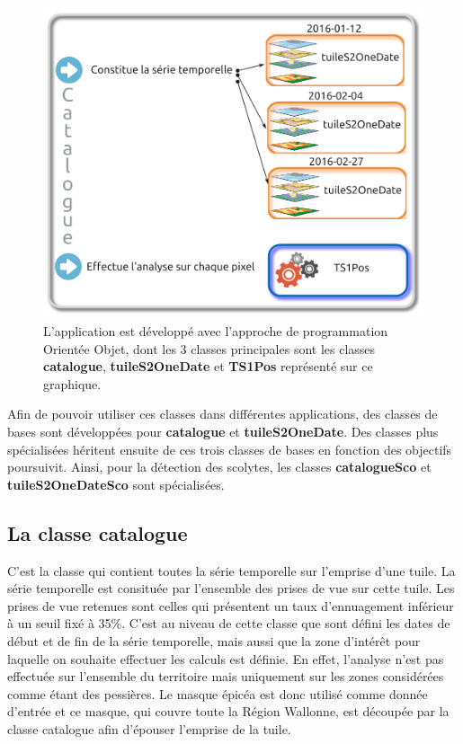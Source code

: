 \documentclass[a4paper, 12pt]{article} %
\begin{document}
\begin{figure}
	\centering
	\includegraphics[width=\linewidth]{illuAppliS2TS.png}
	\caption{L'application est développé avec l'approche de programmation Orientée Objet, dont les 3 classes principales sont les classes \textbf{catalogue}, \textbf{tuileS2OneDate} et \textbf{TS1Pos} représenté sur ce graphique.\textbf{}}
	\label{fig:classes}
\end{figure}

Afin de pouvoir utiliser ces classes dans différentes applications, des classes de bases sont développées pour \textbf{catalogue} et \textbf{tuileS2OneDate}. Des classes plus spécialisées héritent ensuite de ces trois classes de bases en fonction des objectifs poursuivit. Ainsi, pour la détection des scolytes, les classes \textbf{catalogueSco} et \textbf{tuileS2OneDateSco}  sont spécialisées.


\subsection{La classe \textbf{catalogue}}

C'est la classe qui contient toutes la série temporelle sur l'emprise d'une tuile. La série temporelle est consituée par l'ensemble des prises de vue sur cette tuile. Les prises de vue retenues sont celles qui présentent un taux d'ennuagement inférieur à un seuil fixé à 35\%. C'est au niveau de cette classe que sont défini les dates de début et de fin de la série temporelle, mais aussi que la zone d'intérêt pour laquelle on souhaite effectuer les calculs est définie. En effet, l'analyse n'est pas effectuée sur l'ensemble du territoire mais uniquement sur les zones considérées comme étant des pessières. Le masque épicéa est donc utilisé comme donnée d'entrée et ce masque, qui couvre toute la Région Wallonne, est découpée par la classe catalogue afin d'épouser l'emprise de la tuile.
\end{document}
